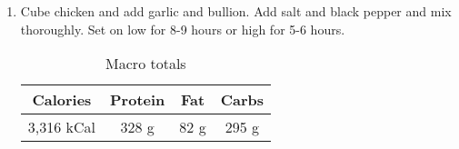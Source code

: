 \documentclass{report}
\begin{document}
\begin{multicols}{2}
\begin{enumerate}
\medskip
\item Cube chicken and add garlic and bullion. Add salt and black pepper and mix thoroughly. Set on low for 8-9 hours or high for 5-6 hours. 
  
\begin{table}[H]
    \centering
    \caption{Macro totals}
    \label{tab:table1}
    \begin{tabular}{c|c|c|c} %
      \textbf{Calories} & \textbf{Protein} & \textbf{Fat} & \textbf{Carbs}\\
      \hline
      3,316 kCal & 328 g & 82 g & 295 g\\
    \end{tabular}
\end{table}

\end{enumerate}
\end{multicols}



\end{document}

